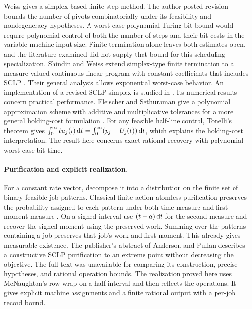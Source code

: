 Weiss gives a simplex-based finite-step method. The author-posted revision bounds the number of pivots combinatorially under its feasibility and nondegeneracy hypotheses. A worst-case polynomial Turing bit bound would require polynomial control of both the number of steps and their bit costs in the variable-machine input size. Finite termination alone leaves both estimates open, and the literature examined did not supply that bound for this scheduling specialization. Shindin and Weiss extend simplex-type finite termination to a measure-valued continuous linear program with constant coefficients that includes SCLP \cite{shindinweiss2020}. Their general analysis allows exponential worst-case behavior. An implementation of a revised SCLP simplex is studied in \cite{shindin2021}. Its numerical results concern practical performance. Fleischer and Sethuraman give a polynomial approximation scheme with additive and multiplicative tolerances for a more general holding-cost formulation \cite{fleischer2005}. For any feasible half-line control, Tonelli's theorem gives $\int_0^\infty t u_j(t)\,\mathrm{d}t=\int_0^\infty(p_j-U_j(t))\,\mathrm{d}t$, which explains the holding-cost interpretation. The result here concerns exact rational recovery with polynomial worst-case bit time.

\paragraph{Purification and explicit realization.}
For a constant rate vector, decompose it into a distribution on the finite set of binary feasible job patterns. Classical finite-action atomless purification preserves the probability assigned to each pattern under both time measure and first-moment measure \cite[\S2]{dww1950}. On a signed interval use $(t-a)\,\mathrm{d}t$ for the second measure and recover the signed moment using the preserved work. Summing over the patterns containing a job preserves that job's work and first moment. This already gives measurable existence. The publisher's abstract of Anderson and Pullan \cite{andersonpullan1996} describes a constructive SCLP purification to an extreme point without decreasing the objective. The full text was unavailable for comparing its construction, precise hypotheses, and rational operation bounds. The realization proved here uses McNaughton's row wrap \cite[Theorem~3.1]{mcnaughton1959} on a half-interval and then reflects the operations. It gives explicit machine assignments and a finite rational output with a per-job record bound.

